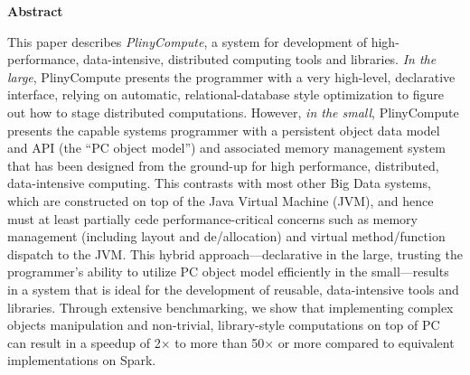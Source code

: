 
\noindent
\textbf{Abstract}

\noindent
This paper describes \emph{PlinyCompute}, a system for development of
high-performance, data-intensive, distributed computing tools and libraries.
\emph{In the large}, PlinyCompute presents the programmer with a very high-level,
declarative interface, relying on automatic, relational-database style optimization to figure out how to stage
distributed computations.  However, \emph{in the small}, PlinyCompute
presents the capable systems programmer with a persistent object data model and API (the ``PC object model'') and associated memory management system
that has been designed from the ground-up for
high performance, distributed, data-intensive computing.
This contrasts with most other Big Data systems, which are constructed on top of the
Java Virtual Machine (JVM), and hence must
at least partially cede performance-critical concerns such as
memory management (including layout and de/allocation) and virtual
method/function dispatch to the JVM.
This hybrid approach---declarative in the large, trusting the programmer's ability
to utilize PC object model efficiently
in the small---results in a system that is ideal for the development of reusable, data-intensive tools and libraries.
Through extensive benchmarking, we show that implementing complex
objects manipulation and non-trivial, library-style computations 
 on top of PC can result in a speedup of 2$\times$ to
 more than 50$\times$ or more compared to equivalent implementations on Spark.
